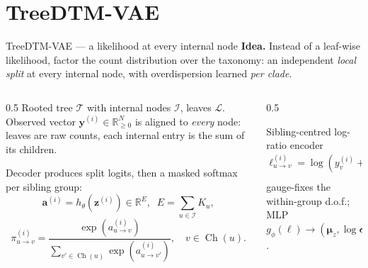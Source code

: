 \documentclass[aspectratio=169,11pt]{beamer}
\newcommand{\R}{\mathbb R}
\newcommand{\Tree}{\mathcal T}
\newcommand{\Inodes}{\mathcal I}
\newcommand{\Ch}{\operatorname{Ch}}
\begin{document}
\section{TreeDTM-VAE}
\begin{frame}{TreeDTM-VAE --- a likelihood at every internal node}
  \textbf{Idea.} Instead of a leaf-wise likelihood, factor the count distribution
  over the taxonomy: an independent \emph{local split} at every internal node, with
  overdispersion learned \emph{per clade}.
  \begin{columns}[T]
    \begin{column}{0.5\textwidth}
      \small
      Rooted tree $\Tree$ with internal nodes $\Inodes$, leaves $\mathcal L$.
      Observed vector $\mathbf y^{(i)}\in\R^{N}_{\ge 0}$ is aligned to \emph{every}
      node: leaves are raw counts, each internal entry is the sum of its children.
      \smallskip

      Decoder produces split logits, then a masked softmax per sibling group:
      \[
        \mathbf a^{(i)}=h_\theta(\mathbf z^{(i)})\in\R^{E},\;\;
        E=\!\!\sum_{u\in\Inodes}\!K_u,
      \]
      \[
        \pi^{(i)}_{u\to v}
        =\frac{\exp(a^{(i)}_{u\to v})}{\sum_{v'\in\Ch(u)}\exp(a^{(i)}_{u\to v'})},
        \quad v\in\Ch(u).
      \]
    \end{column}
    \begin{column}{0.5\textwidth}
      \centering

      \vspace{0.3em}
      \begin{block}{Sibling-centred log-ratio encoder}
        \footnotesize
        \[
          \ell^{(i)}_{u\to v}=\log(y^{(i)}_v+\tau)
          -\tfrac{1}{K_u}\!\!\sum_{v'\in\Ch(u)}\!\!\log(y^{(i)}_{v'}+\tau)
        \]
        gauge-fixes the within-group d.o.f.; MLP $g_\phi(\bm\ell)\to(\bm\mu_z,\log\bm\sigma_z^2)$.
      \end{block}
    \end{column}
  \end{columns}
\end{frame}
\end{document}
